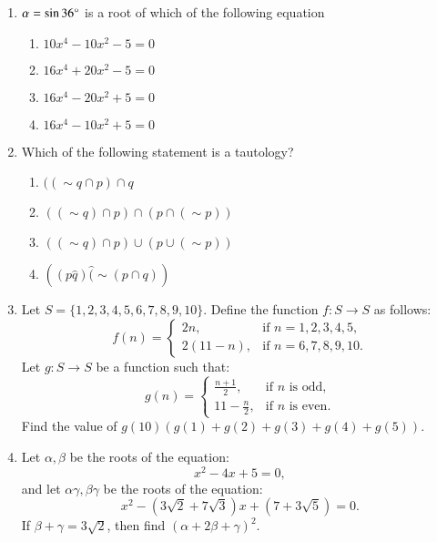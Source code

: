 \documentclass[journal,12pt,twocolumn]{IEEEtran}
\theoremstyle{remark}
\begin{document}
\begin{enumerate}
    \item $\alpha = \sin 36\degree$ is a root of which of the following equation
    \begin{multicols}{2}
    \begin{enumerate}
        \item $10x^4 - 10x^2 -5 = 0$
        \item $16x^4 + 20x^2 -5 = 0$
        \item $16x^4 - 20x^2 +5 = 0$
        \item $16x^4 - 10x^2 +5 = 0$
    \end{enumerate}
    \end{multicols}

    \item Which of the following statement is a tautology?
    \begin{multicols}{2}
    \begin{enumerate}
        \item $((\sim q \cap p)\cap q $
        \item $((\sim q) \cap p) \cap (p \cap (\sim p))$
        \item $((\sim q) \cap p) \cup (p \cup (\sim p))$
        \item $((p \hat q) \hat (\sim(p \cap q))$
    \end{enumerate}
    \end{multicols}

    
    \item Let $ S = \{1, 2, 3, 4, 5, 6, 7, 8, 9, 10\} $. Define the function $ f: S \to S $ as follows:
    \[
    f(n) = 
    \begin{cases}
    2n, & \text{if } n = 1, 2, 3, 4, 5, \\
    2(11 - n), & \text{if } n = 6, 7, 8, 9, 10.
    \end{cases}
    \]
    Let $ g: S \to S $ be a function such that:
    \[
    g(n) =
    \begin{cases}
    \frac{n+1}{2}, & \text{if } n \text{ is odd}, \\
    11 - \frac{n}{2}, & \text{if } n \text{ is even}.
    \end{cases}
    \]
    Find the value of $ g(10) \left( g(1) + g(2) + g(3) + g(4) + g(5) \right) $.

    \item Let $ \alpha, \beta $ be the roots of the equation:
    \[
    x^2 - 4x + 5 = 0,
    \]
    and let $ \alpha \gamma, \beta \gamma $ be the roots of the equation:
    \[
    x^2 - (3\sqrt{2} + 7\sqrt{3})x + (7 + 3\sqrt{5}) = 0.
    \]
    If $ \beta + \gamma = 3\sqrt{2} $, then find $ (\alpha + 2\beta + \gamma)^2 $.


\end{enumerate}
\end{document}
